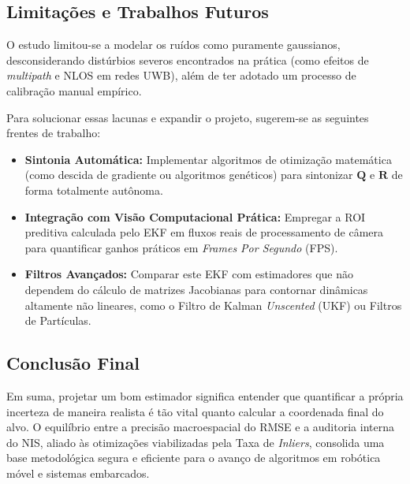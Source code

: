 \subsection{Limitações e Trabalhos Futuros}
\label{subsec:limitations_future}

O estudo limitou-se a modelar os ruídos como puramente gaussianos, desconsiderando distúrbios severos encontrados na prática (como efeitos de \textit{multipath} e NLOS em redes UWB), além de ter adotado um processo de calibração manual empírico. 

Para solucionar essas lacunas e expandir o projeto, sugerem-se as seguintes frentes de trabalho:
\begin{itemize}
    \item \textbf{Sintonia Automática:} Implementar algoritmos de otimização matemática (como descida de gradiente ou algoritmos genéticos) para sintonizar $\mathbf{Q}$ e $\mathbf{R}$ de forma totalmente autônoma.
    \item \textbf{Integração com Visão Computacional Prática:} Empregar a ROI preditiva calculada pelo EKF em fluxos reais de processamento de câmera para quantificar ganhos práticos em \textit{Frames Por Segundo} (FPS).
    \item \textbf{Filtros Avançados:} Comparar este EKF com estimadores que não dependem do cálculo de matrizes Jacobianas para contornar dinâmicas altamente não lineares, como o Filtro de Kalman \textit{Unscented} (UKF) ou Filtros de Partículas.
\end{itemize}

\subsection{Conclusão Final}
\label{subsec:final_conclusion}

Em suma, projetar um bom estimador significa entender que quantificar a própria incerteza de maneira realista é tão vital quanto calcular a coordenada final do alvo. O equilíbrio entre a precisão macroespacial do RMSE e a auditoria interna do NIS, aliado às otimizações viabilizadas pela Taxa de \textit{Inliers}, consolida uma base metodológica segura e eficiente para o avanço de algoritmos em robótica móvel e sistemas embarcados.